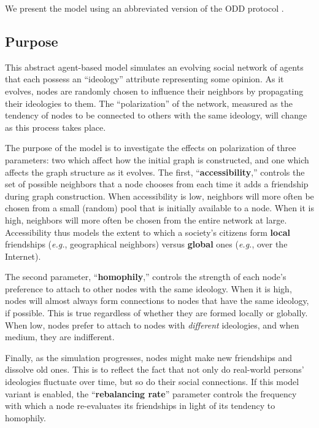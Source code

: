 
\label{sec:model}

We present the model using an abbreviated version of the ODD protocol
\cite{polhill_using_2008}.

\subsection{Purpose}

This abstract agent-based model simulates an evolving social network of agents
that each possess an ``ideology'' attribute representing some opinion. As it
evolves, nodes are randomly chosen to influence their neighbors by propagating
their ideologies to them. The ``polarization'' of the network, measured as the
tendency of nodes to be connected to others with the same ideology, will
change as this process takes place. 

The purpose of the model is to investigate the effects on polarization of
three parameters: two which affect how the initial graph is constructed, and
one which affects the graph structure as it evolves. The first,
``\textbf{accessibility},'' controls the set of possible neighbors that a node
chooses from each time it adds a friendship during graph construction. When
accessibility is low, neighbors will more often be chosen from a small
(random) pool that is initially available to a node. When it is high,
neighbors will more often be chosen from the entire network at large.
Accessibility thus models the extent to which a society's citizens form
\textbf{local} friendships (\textit{e.g.}, geographical neighbors) versus
\textbf{global} ones (\textit{e.g.}, over the Internet).

The second parameter, ``\textbf{homophily},'' controls the strength of each
node's preference to attach to other nodes with the same ideology. When it is
high, nodes will almost always form connections to nodes that have the same
ideology, if possible. This is true regardless of whether they are formed
locally or globally. When low, nodes prefer to attach to nodes with
\textit{different} ideologies, and when medium, they are indifferent.

Finally, as the simulation progresses, nodes might make new friendships and
dissolve old ones. This is to reflect the fact that not only do real-world
persons' ideologies fluctuate over time, but so do their social connections.
If this model variant is enabled, the ``\textbf{rebalancing rate}'' parameter
controls the frequency with which a node re-evaluates its friendships in light
of its tendency to homophily.

